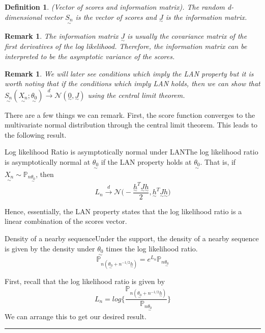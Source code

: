 \documentclass[twoside]{article}
\newtheorem{definition}[theorem]{Definition}
\newtheorem{remark}[theorem]{Remark}
\newenvironment{proof}{{\bf Proof:}}{\hfill\rule{2mm}{2mm}}
\newcommand{\prob}{\mathbb{P}}
\newcommand{\utilde}{\underset{\sim}}
\begin{document}
\begin{definition}(Vector of scores and information matrix). The random d-dimensional vector $\utilde{S_n}$ is the vector of scores and $\utilde{J}$ is the information matrix.
\end{definition}

\begin{remark}The information matrix $\utilde{J}$ is usually the covariance matrix of the first derivatives of the log likelihood. Therefore, the information matrix can be interpreted to be the asymptotic variance of the scores.
\end{remark}

\begin{remark} We will later see conditions which imply the LAN property but it is worth noting that if the conditions which imply LAN holds, then we can show that $
\utilde{S_n}(\utilde{X_n}; \utilde{\theta_0}) \xrightarrow{d} \mathcal{N}(\utilde{0}, \utilde{J})
$ using the central limit theorem.
\end{remark}
 
There are a few things we can remark. First, the score function converges to the multivariate normal distribution through the central limit theorem. This leads to the following result.

\begin{proposition_exam}{Log likelihood Ratio is asymptotically normal under LAN}{}The log likelihood ratio is asymptotically normal at $\utilde{\theta_0}$ if the LAN property holds at $\utilde{\theta_0}.$ That is, if $\utilde{X_n} \sim \prob_{n \utilde{\theta_0}}$, then
$$
L_n \xrightarrow{d} \mathcal{N}\bigg(-\frac{\utilde{h}^T\utilde{J}\utilde{h}}{2},\utilde{h}^T\utilde{J}\utilde{h} \bigg)
$$
\end{proposition_exam}

Hence, essentially, the LAN property states that the log likelihood ratio is a linear combination of the scores vector.

\begin{proposition_exam}{Density of a nearby sequence}{}Under the support, the density of a nearby sequence is given by the density under $\utilde{\theta_0}$ times the log likelihood ratio.
$$
\prob_{n(\utilde{\theta_0} + n^{-1/2}\utilde{h})} = e^{L_n}\prob_{n\utilde{\theta_0}}
$$
\end{proposition_exam}

\begin{proof} First, recall that the log likelihood ratio is given by
$$
L_n = log \bigg\{\frac{\prob_{n(\utilde{\theta_0} + n^{-1/2}\utilde{h})}}{\prob_{n\utilde{\theta_0}}} \bigg\}
$$
We can arrange this to get our desired result.
\end{proof}
\end{document}
